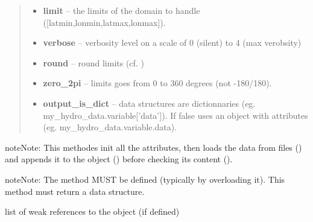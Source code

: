 \documentclass[letterpaper,10pt,english]{sphinxmanual}
\begin{document}
\begin{fulllineitems}
\begin{fulllineitems}
\begin{quote}
\begin{description}
\begin{itemize}
\item {} 
\textbf{limit} -- the limits of the domain to handle ({[}latmin,lonmin,latmax,lonmax{]}).

\item {} 
\textbf{verbose} -- verbosity level on a scale of 0 (silent) to 4 (max verobsity)

\item {} 
\textbf{round} -- round limits (cf. )

\item {} 
\textbf{zero\_2pi} -- limits goes from 0 to 360 degrees (not -180/180).

\item {} 
\textbf{output\_is\_dict} -- data structures are dictionnaries (eg. my\_hydro\_data.variable{[}'data'{]}). If false uses an object with attributes (eg. my\_hydro\_data.variable.data).

\end{itemize}

\end{description}\end{quote}

\begin{notice}{note}{Note:}
This methodes init all the attributes, then loads the data from files () and appends it to the object ({\hyperref[altimetry.data:altimetry.data.hydro_data.update_dataset]{}}) before checking its content ({\hyperref[altimetry.data:altimetry.data.hydro_data.check_variables]{}}).
\end{notice}

\begin{notice}{note}{Note:}
The method  MUST be defined (typically by overloading it). This method must return a data structure.
\end{notice}

\end{fulllineitems}


\begin{fulllineitems}
\label{altimetry.data:altimetry.data.hydro_data.__weakref__}
list of weak references to the object (if defined)

\end{fulllineitems}


\end{fulllineitems}
\end{document}
